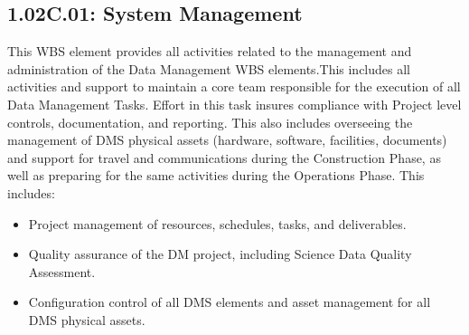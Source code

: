 \subsection{1.02C.01: System Management}

This WBS element provides all activities related to the management and
administration of the Data Management WBS elements.This includes all activities
and support to maintain a core team responsible for the execution of all Data
Management Tasks. Effort in this task insures compliance with Project level
controls, documentation, and reporting. This also includes overseeing the
management of DMS physical assets (hardware, software, facilities, documents)
and support for travel and communications during the Construction Phase, as
well as preparing for the same activities during the Operations Phase. This
includes:

\begin{itemize}

  \item{Project management of resources, schedules, tasks, and deliverables.}

  \item{Quality assurance of the DM project, including Science Data Quality
  Assessment.}

  \item{Configuration control of all DMS elements and asset management for all
  DMS physical assets.}

\end{itemize}
